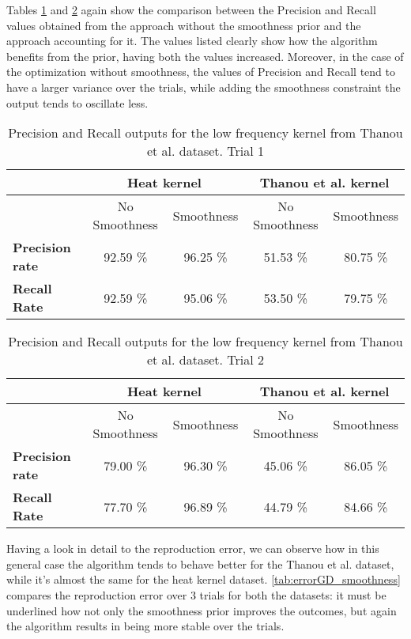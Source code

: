 Tables \ref{tab:PrecRec_compSmth1} and \ref{tab:PrecRec_compSmth2} again show the comparison between the Precision and Recall values obtained from the approach without the smoothness prior and the approach accounting for it. The values listed clearly show how the algorithm benefits from the prior, having both the values increased. Moreover, in the case of the optimization without smoothness, the values of Precision and Recall tend to have a larger variance over the trials, while adding the smoothness constraint the output tends to oscillate less.

\begin{table}[htbp]
  \centering
  \begin{tabular}{lcccc}
  &\multicolumn{2}{c}{\textbf{Heat kernel}}&\multicolumn{2}{c}{\textbf{Thanou et al. kernel}}\\
  \toprule
  &No Smoothness & Smoothness & No Smoothness & Smoothness\\
  \midrule
    \textbf{Precision rate} & 92.59 \% & 96.25 \% & 51.53 \% & 80.75   \%\\
    \textbf{Recall Rate} & 92.59 \% & 95.06 \% & 53.50 \% & 79.75 \%\\
  \bottomrule
  \end{tabular}
 \caption{Precision and Recall outputs for the low frequency kernel from Thanou et al. dataset. Trial 1}
 \label{tab:PrecRec_compSmth1}
 \end{table}

 \begin{table}[htbp]
   \centering
   \begin{tabular}{lcccc}
   &\multicolumn{2}{c}{\textbf{Heat kernel}}&\multicolumn{2}{c}{\textbf{Thanou et al. kernel}}\\
   \toprule
   &No Smoothness & Smoothness & No Smoothness & Smoothness\\
   \midrule
    \textbf{Precision rate} & 79.00 \% & 96.30 \% & 45.06 \% & 86.05  \%\\
    \textbf{Recall Rate} & 77.70 \% & 96.89 \% & 44.79 \% & 84.66 \%\\
    \bottomrule
    \end{tabular}
   \caption{Precision and Recall outputs for the low frequency kernel from Thanou et al. dataset. Trial 2}
  \label{tab:PrecRec_compSmth2}
   \end{table}

Having a look in detail to the reproduction error, we can observe how in this general case the algorithm tends to behave better for the Thanou et al. dataset, while it's almost the same for the heat kernel dataset. \autoref{tab:errorGD_smoothness} compares the reproduction error over $3$ trials for both the datasets: it must be underlined how not only the smoothness prior improves the outcomes, but again the algorithm results in being more stable over the trials.

